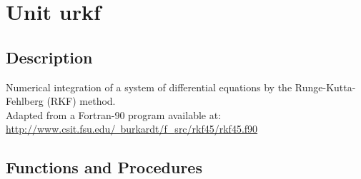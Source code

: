 \documentclass[12pt,a4paper,oneside]{report}
\begin{document}
\section{Unit urkf}
\label{urkf}
\subsection{Description}
Numerical integration of a system of differential equations by the Runge{-}Kutta{-}Fehlberg (RKF) method.\\
Adapted from a Fortran{-}90 program available at:\\ \href{http://www.csit.fsu.edu/~burkardt/f_src/rkf45/rkf45.f90}{http://www.csit.fsu.edu/~burkardt/f{\_}src/rkf45/rkf45.f90}\\ 
\subsection{Functions and Procedures}
\end{document}
